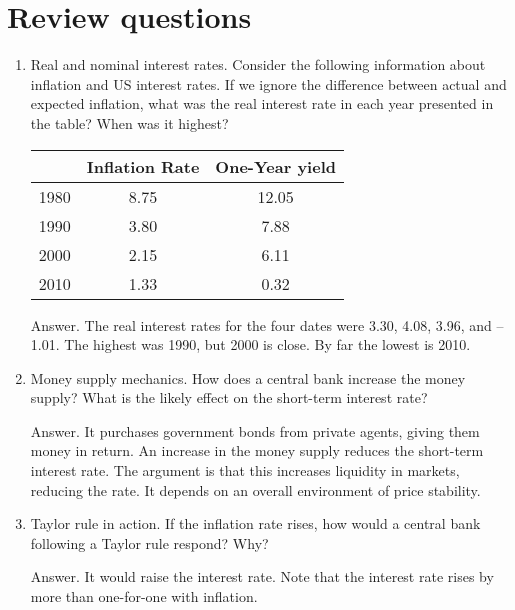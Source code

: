 \section*{Review questions}

\begin{enumerate}
\item Real and nominal interest rates.
Consider the following information about inflation and US interest rates.
If we ignore the difference between actual and expected inflation,
what was the real interest rate in each year presented in the table?
When was it highest?

\begin{center}
\begin{tabular}{lcc}
\toprule
        & Inflation Rate & One-Year yield \index{bond!bond yield}
 \\
\midrule
1980 & 8.75 & 12.05\\
1990 & 3.80 & 7.88\\
2000 & 2.15 & 6.11\\
2010 & 1.33 & 0.32\\
\bottomrule
\end{tabular}
\end{center}

Answer.  The real interest rates for the four dates
were 3.30, 4.08, 3.96, and --1.01.
The highest was 1990, but 2000 is close.
By far the lowest is 2010.

\item Money supply mechanics.  How does a central bank increase the money supply?
What is the likely effect on the short-term interest rate?

Answer.
It purchases government bonds from private agents,
giving them money in return.
An increase in the money supply reduces the short-term
interest rate.
The argument is that this increases liquidity in markets, reducing
the rate.
It depends on an overall environment of price stability.

\item Taylor rule in action.  If the inflation rate rises,
how would a central bank following a Taylor rule respond?
Why?

Answer.  It would raise the interest rate.
Note that the interest rate rises by more than one-for-one
with inflation.


\end{enumerate}
